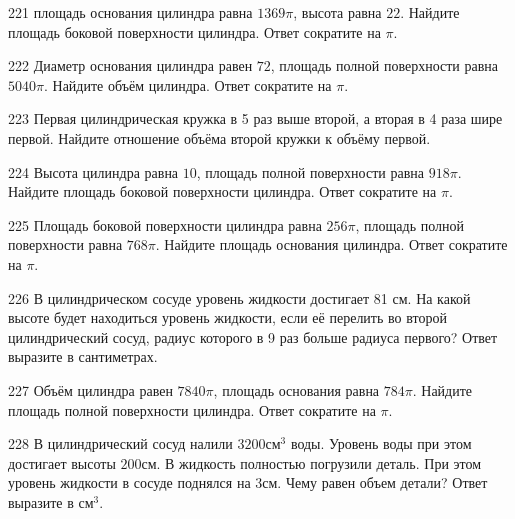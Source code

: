 \documentclass[4apaper]{article}
\begin{document}
\begin{taskBN}{221}
площадь основания цилиндра равна $1369\pi$, высота равна $22$. Найдите площадь боковой поверхности цилиндра. Ответ сократите на $\pi$.
\end{taskBN}

\begin{taskBN}{222}
Диаметр основания цилиндра равен $72$, площадь полной поверхности равна $5040\pi$. Найдите объём цилиндра. Ответ сократите на $\pi$.
\end{taskBN}

\begin{taskBN}{223}
 Первая цилиндрическая кружка в 5 раз выше второй, а вторая в 4 раза шире первой. Найдите отношение объёма второй кружки к объёму первой.
\end{taskBN}

\begin{taskBN}{224}
Высота цилиндра равна $10$, площадь полной поверхности равна $918\pi$. Найдите площадь боковой поверхности цилиндра. Ответ сократите на $\pi$.
\end{taskBN}

\begin{taskBN}{225}
Площадь боковой поверхности цилиндра равна $256\pi$, площадь полной поверхности равна $768\pi$. Найдите площадь основания цилиндра. Ответ сократите на $\pi$.
\end{taskBN}

\begin{taskBN}{226}
В цилиндрическом сосуде уровень жидкости достигает 81 см. На какой высоте будет находиться уровень жидкости, если её перелить во второй цилиндрический сосуд, радиус которого в 9 раз больше радиуса первого? Ответ выразите в сантиметрах.
\end{taskBN}

\begin{taskBN}{227}
Объём цилиндра равен $7840\pi$, площадь основания равна $784\pi$. Найдите площадь полной поверхности цилиндра. Ответ сократите на $\pi$.
\end{taskBN}

\begin{taskBN}{228}
В цилиндрический сосуд налили $3200\mbox{см}^3$ воды. Уровень воды при этом достигает высоты $200$см. В жидкость полностью погрузили деталь. При этом уровень жидкости в сосуде поднялся на $3$см. Чему равен объем детали? Ответ выразите в $\mbox{см}^3$.
\end{taskBN}
\end{document}
